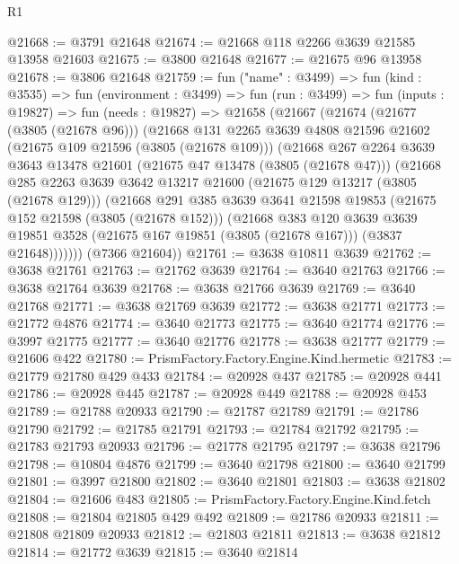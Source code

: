 \begin{lexlean}{R1}
\begin{coremodule}
@21668 := @3791 @21648
@21674 := @21668 @118 @2266 @3639 @21585 @13958 @21603
@21675 := @3800 @21648
@21677 := @21675 @96 @13958
@21678 := @3806 @21648
@21759 := fun ("name" : @3499) =>
  fun (kind : @3535) =>
  fun (environment : @3499) =>
  fun (run : @3499) =>
  fun (inputs : @19827) =>
  fun (needs : @19827) =>
  @21658
    (@21667
      (@21674
        (@21677 (@3805 (@21678 @96)))
        (@21668
          @131
          @2265
          @3639
          @4808
          @21596
          @21602
          (@21675 @109 @21596 (@3805 (@21678 @109)))
          (@21668
            @267
            @2264
            @3639
            @3643
            @13478
            @21601
            (@21675 @47 @13478 (@3805 (@21678 @47)))
            (@21668
              @285
              @2263
              @3639
              @3642
              @13217
              @21600
              (@21675 @129 @13217 (@3805 (@21678 @129)))
              (@21668
                @291
                @385
                @3639
                @3641
                @21598
                @19853
                (@21675 @152 @21598 (@3805 (@21678 @152)))
                (@21668
                  @383
                  @120
                  @3639
                  @3639
                  @19851
                  @3528
                  (@21675 @167 @19851 (@3805 (@21678 @167)))
                  (@3837 @21648)))))))
      (@7366 @21604))
@21761 := @3638 @10811 @3639
@21762 := @3638 @21761
@21763 := @21762 @3639
@21764 := @3640 @21763
@21766 := @3638 @21764 @3639
@21768 := @3638 @21766 @3639
@21769 := @3640 @21768
@21771 := @3638 @21769 @3639
@21772 := @3638 @21771
@21773 := @21772 @4876
@21774 := @3640 @21773
@21775 := @3640 @21774
@21776 := @3997 @21775
@21777 := @3640 @21776
@21778 := @3638 @21777
@21779 := @21606 @422
@21780 := PrismFactory.Factory.Engine.Kind.hermetic
@21783 := @21779 @21780 @429 @433
@21784 := @20928 @437
@21785 := @20928 @441
@21786 := @20928 @445
@21787 := @20928 @449
@21788 := @20928 @453
@21789 := @21788 @20933
@21790 := @21787 @21789
@21791 := @21786 @21790
@21792 := @21785 @21791
@21793 := @21784 @21792
@21795 := @21783 @21793 @20933
@21796 := @21778 @21795
@21797 := @3638 @21796
@21798 := @10804 @4876
@21799 := @3640 @21798
@21800 := @3640 @21799
@21801 := @3997 @21800
@21802 := @3640 @21801
@21803 := @3638 @21802
@21804 := @21606 @483
@21805 := PrismFactory.Factory.Engine.Kind.fetch
@21808 := @21804 @21805 @429 @492
@21809 := @21786 @20933
@21811 := @21808 @21809 @20933
@21812 := @21803 @21811
@21813 := @3638 @21812
@21814 := @21772 @3639
@21815 := @3640 @21814

\end{coremodule}
\end{lexlean}
